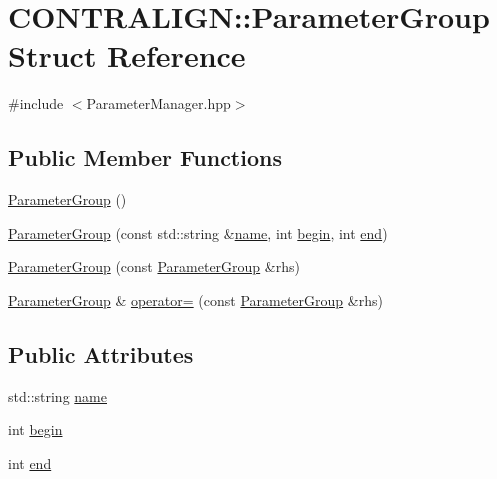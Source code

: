 \hypertarget{struct_c_o_n_t_r_a_l_i_g_n_1_1_parameter_group}{\section{C\+O\+N\+T\+R\+A\+L\+I\+G\+N\+:\+:Parameter\+Group Struct Reference}
\label{struct_c_o_n_t_r_a_l_i_g_n_1_1_parameter_group}
}


{\ttfamily \#include $<$Parameter\+Manager.\+hpp$>$}

\subsection*{Public Member Functions}
\begin{DoxyCompactItemize}
\item 
\hyperlink{struct_c_o_n_t_r_a_l_i_g_n_1_1_parameter_group_ac300691fbffbb5ee3e41f992793891f5}{Parameter\+Group} ()
\item 
\hyperlink{struct_c_o_n_t_r_a_l_i_g_n_1_1_parameter_group_a9d98bf3ed52f515f2f4bbbaf2fb0d55d}{Parameter\+Group} (const std\+::string \&\hyperlink{struct_c_o_n_t_r_a_l_i_g_n_1_1_parameter_group_adb73e76d451ef904109962ea5f77f52e}{name}, int \hyperlink{struct_c_o_n_t_r_a_l_i_g_n_1_1_parameter_group_a01e00b1d2abfda8cdce842800306ad0f}{begin}, int \hyperlink{struct_c_o_n_t_r_a_l_i_g_n_1_1_parameter_group_ae458d3b09c3bad4aa3c0827c5ecf8c60}{end})
\item 
\hyperlink{struct_c_o_n_t_r_a_l_i_g_n_1_1_parameter_group_af09957ea9afbc2c73a1d7651def78030}{Parameter\+Group} (const \hyperlink{struct_c_o_n_t_r_a_l_i_g_n_1_1_parameter_group}{Parameter\+Group} \&rhs)
\item 
\hyperlink{struct_c_o_n_t_r_a_l_i_g_n_1_1_parameter_group}{Parameter\+Group} \& \hyperlink{struct_c_o_n_t_r_a_l_i_g_n_1_1_parameter_group_ae97472213f8493f09bc4e5270fe0ca3b}{operator=} (const \hyperlink{struct_c_o_n_t_r_a_l_i_g_n_1_1_parameter_group}{Parameter\+Group} \&rhs)
\end{DoxyCompactItemize}
\subsection*{Public Attributes}
\begin{DoxyCompactItemize}
\item 
std\+::string \hyperlink{struct_c_o_n_t_r_a_l_i_g_n_1_1_parameter_group_adb73e76d451ef904109962ea5f77f52e}{name}
\item 
int \hyperlink{struct_c_o_n_t_r_a_l_i_g_n_1_1_parameter_group_a01e00b1d2abfda8cdce842800306ad0f}{begin}
\item 
int \hyperlink{struct_c_o_n_t_r_a_l_i_g_n_1_1_parameter_group_ae458d3b09c3bad4aa3c0827c5ecf8c60}{end}
\end{DoxyCompactItemize}


